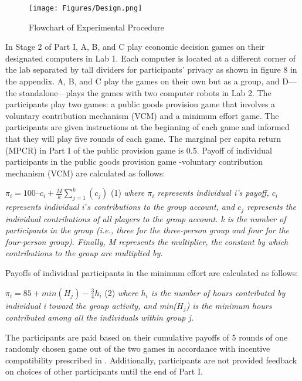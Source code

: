 \begin{figure}[H]
\captionsetup{justification=raggedright,singlelinecheck=false}

\caption{Flowchart of Experimental Procedure}
\texttt{[image: Figures/Design.png]} 
\end{figure}
 
 
 \hspace  *{0mm} In Stage 2 of Part I, A, B, and C play economic decision games on their designated computers in Lab 1.  Each computer is located at a different corner of the lab separated by tall dividers for participants’ privacy as shown in figure 8 in the appendix. A, B, and C play the games on their own but as a group, and D---the standalone---plays the games with two computer robots in Lab 2. The participants play two games: a public goods provision game that involves a voluntary contribution mechanism (VCM) and a minimum effort game. The participants are given instructions at the beginning of each game and informed that they will play five rounds of each game. The marginal per capita return (MPCR) in Part I of the public provision game is 0.5.  Payoff of individual participants in the public goods provision game -voluntary contribution mechanism (VCM) are calculated as follows: 
 
 $ \pi_{i} = 100 $–$ c_{i} + \frac{M}{k}\sum_{j=1}^{k}(c_j )  $ \space \space \space  \space \space \space  \space  (1)
\newline
\noindent\textit{where $\pi_{i}$ represents individual \textit{i}'s payoff, $c_{i}$ represents individual $i’s$ contributions to the group account, and $c_{j}$ represents the individual contributions of all players to the group account. k is the number of participants in the group (i.e., three for the three-person group and four for the four-person group). Finally, M represents the multiplier, the constant by which contributions to the group are multiplied by.}

Payoffs of individual participants in the minimum effort are calculated as follows:

$\pi_{i}  =  85+min(H_{j} )- \frac{3}{4} h_{i}  $   \space \space \space  \space \space \space  \space \space  (2)   
\newline
\noindent\textit{where $h_i$ is the number of hours contributed by individual i toward the group activity, and min($H_j$) is the minimum hours contributed among all the individuals within group j. }

The participants are paid based on their cumulative payoffs of 5 rounds of one randomly chosen game out of the two games in accordance with incentive compatibility prescribed in \cite{ach18}. Additionally, participants are not provided feedback on choices of other participants until the end of Part I. 

